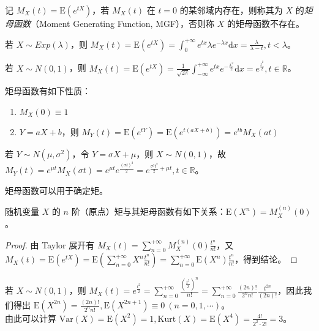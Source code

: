 \documentclass[../main.tex]{subfiles}
\begin{document}
\begin{definition}\label{def:4.6.1}
记 $M_X(t)=\mathrm E(e^{tX})$，若 $M_X(t)$ 在 $t=0$ 的某邻域内存在，则称其为 $X$ 的\emph{矩母函数}（Moment Generating Function, MGF），否则称 $X$ 的矩母函数不存在。
\end{definition}

\begin{example}
若 $X\sim Exp(\lambda)$，则 $M_X(t)=\mathrm E(e^{tX})=\int_0^{+\infty}e^{tx}\lambda e^{-\lambda x}\mathrm dx=\frac\lambda{\lambda-t},t<\lambda$。
\end{example}

\begin{example}
若 $X\sim N(0,1)$，则 $M_X(t)=\mathrm E(e^{tX})=\frac{1}{\sqrt{2\pi}}\int_{-\infty}^{+\infty}e^{tx}e^{-\frac{x^2}2}\mathrm dx=e^{\frac{t^2}2},t\in\mathbb R$。
\end{example}

\begin{proposition}
矩母函数有如下性质：
\begin{enumerate}
    \item $M_X(0)\equiv1$
    \item $Y=aX+b$，则 $M_Y(t)=\mathrm E(e^{tY})=\mathrm E(e^{t(aX+b)})=e^{tb}M_X(at)$
\end{enumerate}
\end{proposition}

\begin{example}
若 $Y\sim N(\mu,\sigma^2)$，令 $Y=\sigma X+\mu$，则 $X\sim N(0,1)$，故 $M_Y(t)=e^{\mu t}M_X(\sigma t)=e^{\mu t}e^{\frac{(\sigma t)^2}2}=e^{\frac{\sigma^2t^2}2+\mu t},t\in\mathbb R$。
\end{example}

矩母函数可以用于确定矩。

\begin{theorem}\label{thm:4.6.1}
随机变量 $X$ 的 $n$ 阶（原点）矩与其矩母函数有如下关系：$\mathrm E(X^n)=M_X^{(n)}(0)$。
\end{theorem}

\begin{proof}
由 Taylor 展开有 $M_X(t)=\sum_{n=0}^{+\infty}M_X^{(n)}(0)\frac{t^n}{n!}$，又 $M_X(t)=\mathrm E(e^{tX})=\mathrm E(\sum_{n=0}^{+\infty}X^n\frac{t^n}{n!})=\sum_{n=0}^{+\infty}\mathrm E(X^n)\frac{t^n}{n!}$，得到结论。
\end{proof}

\begin{example}
若 $X\sim N(0,1)$，则 $M_X(t)=e^{\frac{t^2}2}=\sum_{n=0}^{+\infty}\frac{(\frac{t^2}2)^n}{n!}=\sum_{n=0}^{+\infty}\frac{(2n)!}{2^nn!}\frac{t^{2n}}{(2n)!}$，因此我们得出 $\mathrm E(X^{2n})=\frac{(2n)!}{2^nn!},\mathrm E(X^{2n+1})\equiv0\ (n=0,1,\cdots)$。\\
由此可以计算 $\mathrm{Var}(X)=\mathrm E(X^2)=1,\mathrm{Kurt}(X)=\mathrm E(X^4)=\frac{4!}{2^2\cdot2!}=3$。
\end{example}
\end{document}
